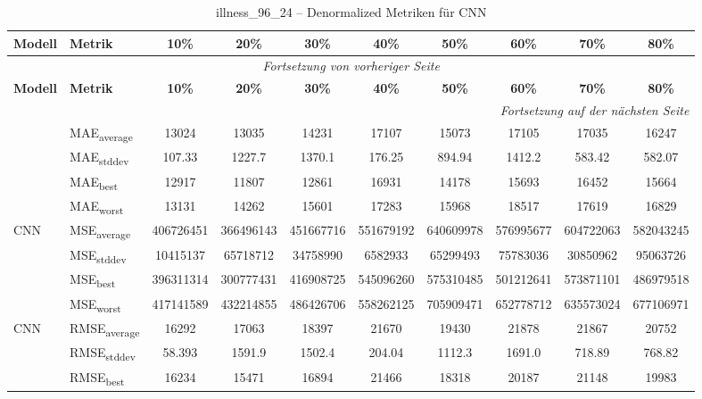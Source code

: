 {\small
\begin{longtable}{l l c c c c c c c c}
    \toprule
    \textbf{Modell} & \textbf{Metrik} & \textbf{10\%} & \textbf{20\%} & \textbf{30\%} & \textbf{40\%} & \textbf{50\%} & \textbf{60\%} & \textbf{70\%} & \textbf{80\%} \\
    \midrule
    \endfirsthead
    \multicolumn{10}{c}{\textit{Fortsetzung von vorheriger Seite}} \\
    \toprule
    \textbf{Modell} & \textbf{Metrik} & \textbf{10\%} & \textbf{20\%} & \textbf{30\%} & \textbf{40\%} & \textbf{50\%} & \textbf{60\%} & \textbf{70\%} & \textbf{80\%} \\
    \midrule
    \endhead
    \midrule
    \multicolumn{10}{r}{\textit{Fortsetzung auf der nächsten Seite}} \\
    \midrule
    \endfoot
    \bottomrule
    \caption{illness_96_24 -- Denormalized Metriken für CNN}
    \label{tab:illness_96_24_denormalized_cnn}
    \endlastfoot
\multirow{4}{*}{CNN} & MAE\textsubscript{average} & 13024 & 13035 & 14231 & 17107 & 15073 & 17105 & 17035 & 16247 \\
 & MAE\textsubscript{stddev} & 107.33 & 1227.7 & 1370.1 & 176.25 & 894.94 & 1412.2 & 583.42 & 582.07 \\
 & MAE\textsubscript{best} & 12917 & 11807 & 12861 & 16931 & 14178 & 15693 & 16452 & 15664 \\
 & MAE\textsubscript{worst} & 13131 & 14262 & 15601 & 17283 & 15968 & 18517 & 17619 & 16829 \\
\cmidrule(lr){2-10}
\multirow{4}{*}{CNN} & MSE\textsubscript{average} & 406726451 & 366496143 & 451667716 & 551679192 & 640609978 & 576995677 & 604722063 & 582043245 \\
 & MSE\textsubscript{stddev} & 10415137 & 65718712 & 34758990 & 6582933 & 65299493 & 75783036 & 30850962 & 95063726 \\
 & MSE\textsubscript{best} & 396311314 & 300777431 & 416908725 & 545096260 & 575310485 & 501212641 & 573871101 & 486979518 \\
 & MSE\textsubscript{worst} & 417141589 & 432214855 & 486426706 & 558262125 & 705909471 & 652778712 & 635573024 & 677106971 \\
\cmidrule(lr){2-10}
\multirow{4}{*}{CNN} & RMSE\textsubscript{average} & 16292 & 17063 & 18397 & 21670 & 19430 & 21878 & 21867 & 20752 \\
 & RMSE\textsubscript{stddev} & 58.393 & 1591.9 & 1502.4 & 204.04 & 1112.3 & 1691.0 & 718.89 & 768.82 \\
 & RMSE\textsubscript{best} & 16234 & 15471 & 16894 & 21466 & 18318 & 20187 & 21148 & 19983 \\

\end{longtable}}
